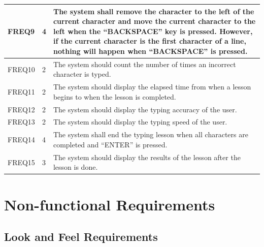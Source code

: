 \documentclass[12pt, titlepage]{article}
\begin{document}
\begin{longtable}{ |m{2cm}|m{1.8cm}|m{9.4cm}| }
    \hline
    FREQ9 & 4 & The system shall remove the character to the left of the current character and move the current character to the left when the “BACKSPACE” key is pressed. However, if the current character is the first character of a line, nothing will happen when “BACKSPACE” is pressed. \\ 
    \hline
    FREQ10 & 2 & The system should count the number of times an incorrect character is typed. \\ 
    \hline
    FREQ11 & 2 & The system should display the elapsed time from when a lesson begins to when the lesson is completed. \\ 
    \hline
    FREQ12 & 2 & The system should display the typing accuracy of the user. \\ 
    \hline
    FREQ13 & 2 & The system should display the typing speed of the user. \\ 
    \hline
    FREQ14 & 4 & The system shall end the typing lesson when all characters are completed and “ENTER” is pressed. \\ 
    \hline
    FREQ15 & 3 & The system should display the results of the lesson after the lesson is done. \\ 
    \hline

\end{longtable}

\section{Non-functional Requirements}
\subsection{Look and Feel Requirements}
\end{document}
